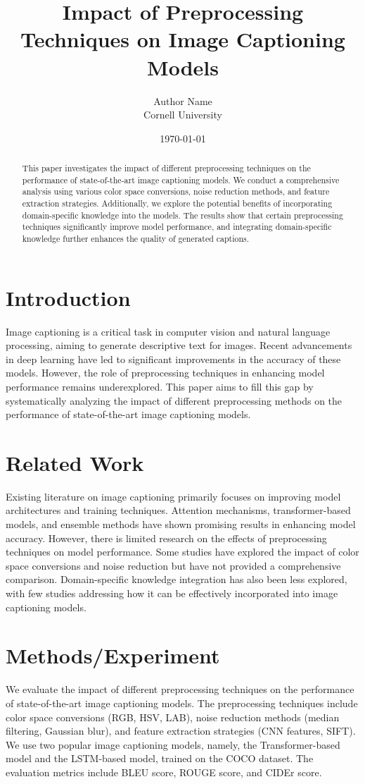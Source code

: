 \documentclass{article}
\title{Impact of Preprocessing Techniques on Image Captioning Models}
\author{Author Name \\ Cornell University}
\date{\today}
\begin{document}
\maketitle

\begin{abstract}
This paper investigates the impact of different preprocessing techniques on the performance of state-of-the-art image captioning models. We conduct a comprehensive analysis using various color space conversions, noise reduction methods, and feature extraction strategies. Additionally, we explore the potential benefits of incorporating domain-specific knowledge into the models. The results show that certain preprocessing techniques significantly improve model performance, and integrating domain-specific knowledge further enhances the quality of generated captions.
\end{abstract}

\section{Introduction}
Image captioning is a critical task in computer vision and natural language processing, aiming to generate descriptive text for images. Recent advancements in deep learning have led to significant improvements in the accuracy of these models. However, the role of preprocessing techniques in enhancing model performance remains underexplored. This paper aims to fill this gap by systematically analyzing the impact of different preprocessing methods on the performance of state-of-the-art image captioning models.

\section{Related Work}
Existing literature on image captioning primarily focuses on improving model architectures and training techniques. Attention mechanisms, transformer-based models, and ensemble methods have shown promising results in enhancing model accuracy. However, there is limited research on the effects of preprocessing techniques on model performance. Some studies have explored the impact of color space conversions and noise reduction but have not provided a comprehensive comparison. Domain-specific knowledge integration has also been less explored, with few studies addressing how it can be effectively incorporated into image captioning models.

\section{Methods/Experiment}
We evaluate the impact of different preprocessing techniques on the performance of state-of-the-art image captioning models. The preprocessing techniques include color space conversions (RGB, HSV, LAB), noise reduction methods (median filtering, Gaussian blur), and feature extraction strategies (CNN features, SIFT). We use two popular image captioning models, namely, the Transformer-based model and the LSTM-based model, trained on the COCO dataset. The evaluation metrics include BLEU score, ROUGE score, and CIDEr score.
\end{document}
